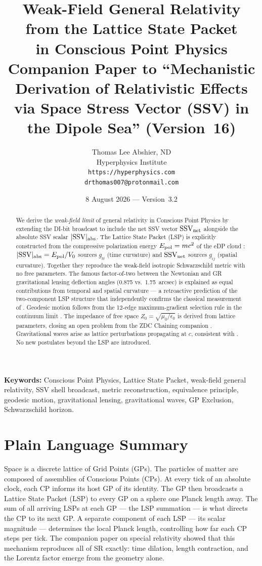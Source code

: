 \documentclass[12pt]{article}
\title{\textbf{Weak-Field General Relativity\\ from the Lattice State Packet \\in Conscious Point Physics}\\[6pt]
{\large Companion Paper to ``Mechanistic Derivation of Relativistic Effects\\
via Space Stress Vector (SSV) in the Dipole Sea'' (Version~16)}}
\author{Thomas Lee Abshier, ND\\
Hyperphysics Institute\\
\texttt{https://hyperphysics.com}\\
\texttt{drthomas007@protonmail.com}}
\date{8 August 2026 --- Version~3.2}
\newcommand{\SSV}{\text{SSV}}
\begin{document}
\maketitle

\noindent\textbf{Keywords:} Conscious Point Physics, Lattice State Packet,
weak-field general relativity, SSV shell broadcast, metric reconstruction,
equivalence principle, geodesic motion, gravitational lensing, gravitational
waves, GP Exclusion, Schwarzschild horizon.

\begin{abstract}
We derive the \emph{weak-field limit} of general relativity in Conscious
Point Physics by extending the DI-bit broadcast to include the net SSV
vector $\mathbf{\SSV}_{\rm net}$ alongside the absolute SSV scalar
$|\SSV|_{\rm abs}$.  The Lattice State Packet (LSP) is explicitly
constructed from the compressive polarization energy $E_{\rm pol} = mc^2$
of the eDP cloud \citep{abshier2026mass}:
$|\SSV|_{\rm abs} = E_{\rm pol}/V_0$ sources $g_{tt}$ (time curvature)
and $\mathbf{\SSV}_{\rm net}$ sources $g_{ij}$ (spatial curvature).
Together they reproduce the weak-field isotropic Schwarzschild metric with
no free parameters.  The famous factor-of-two between the Newtonian and GR
gravitational lensing deflection angles (0.875 vs.\ 1.75~arcsec) is
explained as equal contributions from temporal and spatial curvature ---
a retroactive prediction of the two-component LSP structure that
independently confirms the classical measurement of \citet{eddington1920}.
Geodesic motion follows from the 12-edge maximum-gradient selection rule
in the continuum limit \citep{abshier2026am}.  The impedance of free space
$Z_0 = \sqrt{\mu_0/\epsilon_0}$ is derived from lattice parameters,
closing an open problem from the ZDC Chaining companion
\citep{abshier2026zdc}.  Gravitational waves arise as lattice perturbations
propagating at $c$, consistent with \citet{abbott2016}.  No new postulates
beyond the LSP are introduced.
\end{abstract}

\section*{Plain Language Summary}

Space is a discrete lattice of Grid Points (GPs). The particles of
matter are composed of assemblies of Conscious Points (CPs). At every
tick of an absolute clock, each CP informs its host GP of its identity.
The GP then broadcasts a Lattice State Packet (LSP) to every GP on a
sphere one Planck length away. The sum of all arriving LSPs at each GP
--- the LSP summation --- is what directs the CP to its next GP. A
separate component of each LSP --- its scalar magnitude --- determines
the local Planck length, controlling how far each CP steps per tick.
The companion paper on special relativity showed that this mechanism
reproduces all of SR exactly: time dilation, length contraction, and
the Lorentz factor emerge from the geometry alone.
\end{document}
